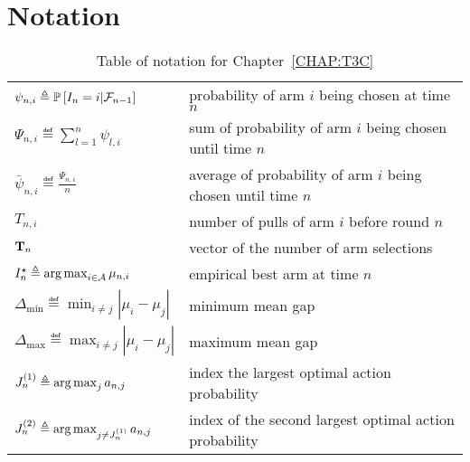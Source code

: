 \section{Notation}\label{app:notation}

\begin{table}[ht]
	\centering
	\caption{Table of notation for Chapter~\ref{CHAP:T3C}\\}
	\begin{tabular}{@{}l|l@{}}
		\toprule
		\thead{Notation} & \thead{Meaning} \\ \midrule
         $\psi_{n,i} \triangleq \mathbb{P}\left[I_n = i | \mathcal{F}_{n-1}\right]$ & probability of arm $i$ being chosen at time $n$\\
         $\Psi_{n,i} \eqdef \sum_{l=1}^n \psi_{l,i}$ & sum of probability of arm $i$ being chosen until time $n$\\
         $\bar{\psi}_{n,i} \eqdef \frac{\Psi_{n,i}}{n}$ & average of probability of arm $i$ being chosen until time $n$\\
         $T_{n,i}$ & number of pulls of arm $i$ before round $n$\\
         ${\bf T}_n$ & vector of the number of arm selections \\ 
         $I_n^\star \triangleq \operatorname*{arg\,max}_{i\in\mathcal{A}} \mu_{n,i}$ & empirical best arm at time $n$ \\
         $\Delta_{\text{min}} \eqdef \min_{i \neq j}|\mu_i-\mu_j|$ & minimum mean gap \\
         $\Delta_{\text{max}} \eqdef \max_{i \neq j}|\mu_i-\mu_j|$ & maximum mean gap \\
         $J_n^{(1)} \triangleq \operatorname*{arg\,max}_{j} a_{n,j}$ & index the largest optimal action probability\\
         $J_n^{(2)} \triangleq \operatorname*{arg\,max}_{j\neq J_n^{(1)}} a_{n,j}$ & index of the second largest optimal action probability\\
		\bottomrule
	\end{tabular}
\end{table}

